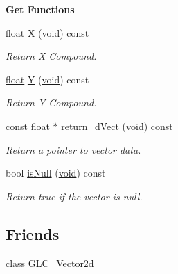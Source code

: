 \begin{Indent}{\bf Get Functions}\par
\begin{DoxyCompactItemize}
\item 
\hyperlink{_super_l_u_support_8h_a6a1bb6ed41f44b60e7bd83b0e9945aa7}{float} \hyperlink{class_g_l_c___vector2df_a1dc5efb0282b1eb6baedefc7b6a082b9}{X} (\hyperlink{group___u_a_v_objects_plugin_ga444cf2ff3f0ecbe028adce838d373f5c}{void}) const 
\begin{DoxyCompactList}\small\item\em Return X Compound. \end{DoxyCompactList}\item 
\hyperlink{_super_l_u_support_8h_a6a1bb6ed41f44b60e7bd83b0e9945aa7}{float} \hyperlink{class_g_l_c___vector2df_ac299cb37d4a54497d5a38ff0d9a937ff}{Y} (\hyperlink{group___u_a_v_objects_plugin_ga444cf2ff3f0ecbe028adce838d373f5c}{void}) const 
\begin{DoxyCompactList}\small\item\em Return Y Compound. \end{DoxyCompactList}\item 
const \hyperlink{_super_l_u_support_8h_a6a1bb6ed41f44b60e7bd83b0e9945aa7}{float} $\ast$ \hyperlink{class_g_l_c___vector2df_a85b376923b41aec1e8eb0b5c9350d022}{return\-\_\-d\-Vect} (\hyperlink{group___u_a_v_objects_plugin_ga444cf2ff3f0ecbe028adce838d373f5c}{void}) const 
\begin{DoxyCompactList}\small\item\em Return a pointer to vector data. \end{DoxyCompactList}\item 
bool \hyperlink{class_g_l_c___vector2df_ae076bf65168ae655ef59c556c3c0d62d}{is\-Null} (\hyperlink{group___u_a_v_objects_plugin_ga444cf2ff3f0ecbe028adce838d373f5c}{void}) const 
\begin{DoxyCompactList}\small\item\em Return true if the vector is null. \end{DoxyCompactList}\end{DoxyCompactItemize}
\end{Indent}
\subsection*{Friends}
\begin{DoxyCompactItemize}
\item 
class \hyperlink{class_g_l_c___vector2df_a99b08fc33718e3306c0d89a0f36732c3}{G\-L\-C\-\_\-\-Vector2d}
\end{DoxyCompactItemize}


